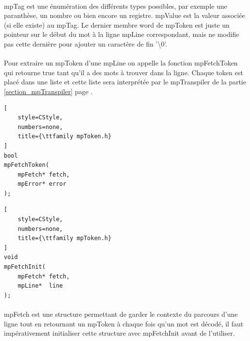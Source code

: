 \documentclass[12pt]{report} %
\begin{document}
\paragraph{}
{\ttfamily mpTag} est une énumération des différents types possibles, par exemple une paranthèse, un nombre ou bien encore un registre. {\ttfamily mpValue} est la valeur associée (si elle existe) au {\ttfamily mpTag}. Le dernier membre {\ttfamily word} de {\ttfamily mpToken} est juste un pointeur sur le début du mot à la ligne {\ttfamily mpLine} correspondant, mais ne modifie pas cette dernière pour ajouter un caractère de fin '{\ttfamily \textbackslash 0}'.

\paragraph{}
Pour extraire un {\ttfamily mpToken} d'une {\ttfamily mpLine} on appelle la fonction {\ttfamily mpFetchToken} qui retourne {\ttfamily true} tant qu'il a des mots à trouver dans la ligne. Chaque token est placé dans une liste et cette liste sera interprétée par le {\ttfamily mpTranspiler} de la partie \ref{section_mpTranspiler} page \pageref{section_mpTranspiler}.

\noindent
\begin{minipage}[t]{.45\textwidth}
\begin{lstlisting}[
    style=CStyle,
    numbers=none,
    title={\ttfamily mpToken.h}
]
bool
mpFetchToken(
    mpFetch* fetch,
    mpError* error
);
\end{lstlisting}
\end{minipage}\hfill
%
\begin{minipage}[t]{.45\textwidth}
\begin{lstlisting}[
    style=CStyle,
    numbers=none,
    title={\ttfamily mpToken.h}
]
void
mpFetchInit(
    mpFetch* fetch,
    mpLine*  line
);
\end{lstlisting}
\end{minipage}

\paragraph{}
{\ttfamily mpFetch} est une structure permettant de garder le contexte du parcours d'une ligne tout en retournant un {\ttfamily mpToken} à chaque fois qu'un mot est décodé, il faut impérativement initialiser cette structure avec {\ttfamily mpFetchInit} avant de l'utiliser.
\end{document}
